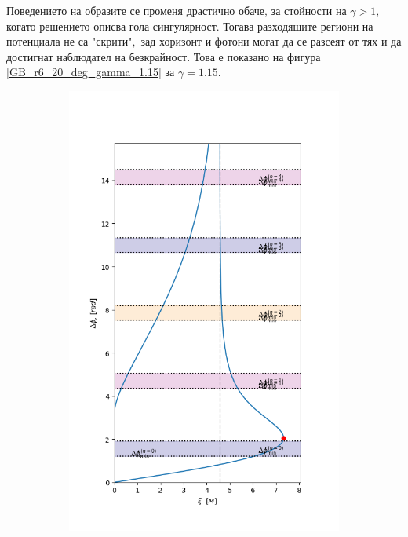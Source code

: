 Поведението на образите се променя драстично обаче, за стойности на $\gamma > 1$, когато решението описва гола сингулярност. Тогава разходящите региони на потенциала не са "скрити"$,$ зад хоризонт и фотони могат да се разсеят от тях и да достигнат наблюдател на безкрайност. Това е показано на фигура \ref{GB_r6_20_deg_gamma_1.15} за $\gamma = 1.15$.

\newpage

\begin{figure}[!htb]
	\begin{subfigure}{6cm}
		\hspace{0.8cm}
		\includegraphics[scale = 0.32]{GB_20_deg_r6_gamma_1.15_impact.png}

\end{subfigure}
\end{figure}
